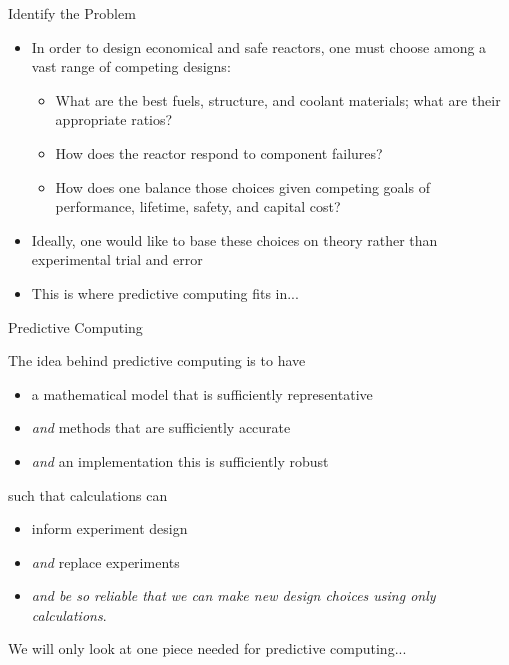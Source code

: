 \documentclass[xcolor=x11names,compress, handout]{beamer}
\renewcommand{\(}{\begin{columns}}
\renewcommand{\)}{\end{columns}}
\newcommand{\<}[1]{\begin{column}{#1}}
\renewcommand{\>}{\end{column}}
\begin{document}
\begin{frame}{Identify the Problem}
\begin{itemize}
\item In order to design economical and safe reactors, one must choose among a vast range of competing designs:
\begin{itemize}
\item What are the \alert{best} fuels, structure, and coolant materials; what are their appropriate ratios?
\item How does the reactor respond to component failures?
\item How does one balance those choices given competing goals of performance, lifetime, safety, and capital cost? 
\vspace*{1 em}
\end{itemize}
\item Ideally, one would like to base these choices on theory rather than experimental trial and error 
\vspace*{1 em}
\item This is where \textcolor{dgreen}{predictive computing} fits in...
\end{itemize}
\end{frame}


\begin{frame}{Predictive Computing}

The idea behind \alert{predictive computing} is to have
\begin{itemize}
\item a mathematical model that is sufficiently representative
\item \textit{and} methods that are sufficiently accurate
\item \textit{and} an implementation this is sufficiently robust
\end{itemize}
\pause
such that \alert{calculations} can
\begin{itemize}
\item inform experiment design
\item \textit{and} replace experiments
\item \textit{and be so reliable that we can make new design choices using only calculations}.
\end{itemize}
\vspace*{1 em}
We will only look at one piece needed for predictive computing...

\end{frame}
\end{document}
